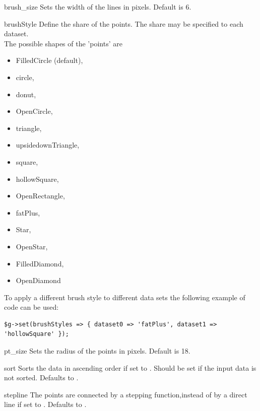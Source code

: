 \constructorblurb{\thisname}

\begin{AttrDecl}{brush\_size}
Sets the width of the lines in pixels. Default is 6.
\end{AttrDecl}

\begin{AttrDecl}{brushStyle}
Define the share of the points. The share may be specified to each dataset.\\
The possible shapes of the 'points' are
\begin{itemize}
\item FilledCircle (default),
\item circle,
\item donut,
\item OpenCircle,
\item triangle,
\item upsidedownTriangle,
\item square,
\item hollowSquare,
\item OpenRectangle,
\item fatPlus,
\item Star,
\item OpenStar,
\item FilledDiamond, 
\item OpenDiamond
\end{itemize} 
To apply a different brush style to different data sets the following
example of code can be used:
\begin{verbatim}
$g->set(brushStyles => { dataset0 => 'fatPlus', dataset1 => 'hollowSquare' });
\end{verbatim}
\end{AttrDecl}


\begin{AttrDecl}{pt\_size}
Sets the radius of the points in pixels. Default is 18.
\end{AttrDecl}

\begin{AttrDecl}{sort}
Sorts the data in ascending order if set to . Should be
set if the input data is not sorted. Defaults to .
\end{AttrDecl}

\begin{AttrDecl}{stepline}
The points are connected by a stepping function,instead of by a direct
line if set to . Defaults to .
\end{AttrDecl}

